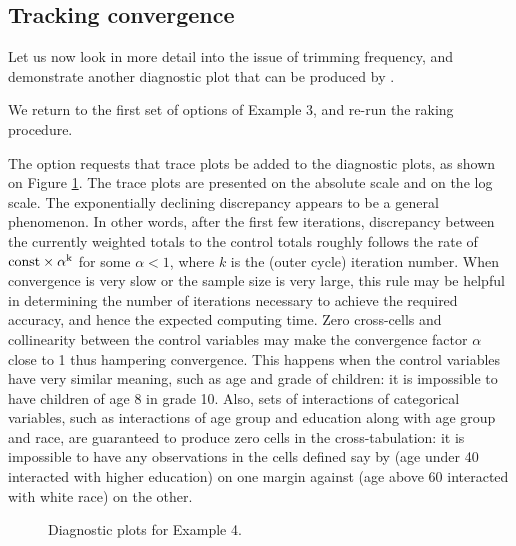 \subsection{Tracking convergence}
\label{subsec:example:trace}

Let us now look in more detail into the issue of trimming frequency,
and demonstrate another diagnostic plot that can be produced by
.

\begin{stexample}[Example 4]

We return to the first set of options of Example 3, and
re-run the raking procedure.

\begin{stlog}
\nullskip
\end{stlog}

The option  requests that trace plots be added to
the diagnostic plots, as shown on Figure \ref{fig:example4:sometimes}.
The trace plots are presented on the absolute scale and on the log scale.
The exponentially declining discrepancy appears to be a general phenomenon.
In other words, after the first few iterations, 
discrepancy between the currently weighted totals to the control totals roughly follows
the rate of $\rm{const} \times \alpha^k$ for some $\alpha<1$, where $k$ is
the (outer cycle) iteration number. When convergence is very slow or the sample
size is very large, this rule may be helpful in determining the number
of iterations necessary to achieve the required accuracy, and hence
the expected computing time. Zero cross-cells and collinearity between 
the control variables may make the convergence factor $\alpha$ close to 1 thus 
hampering convergence. This happens when the control variables have 
very similar meaning, such as age and grade of children: it is impossible
to have children of age 8 in grade 10.
Also, sets of interactions of categorical variables, such as interactions 
of age group and education along with age group and race, are guaranteed to 
produce zero cells in the cross-tabulation: it is impossible to have 
any observations in the cells defined say by 
(age under 40 interacted with higher education) on one margin against
(age above 60 interacted with white race) on the other.

\begin{figure}[!th]
\begin{center}
\end{center}
\caption{Diagnostic plots for Example 4.}
\label{fig:example4:sometimes}
\end{figure}


\end{stexample}
